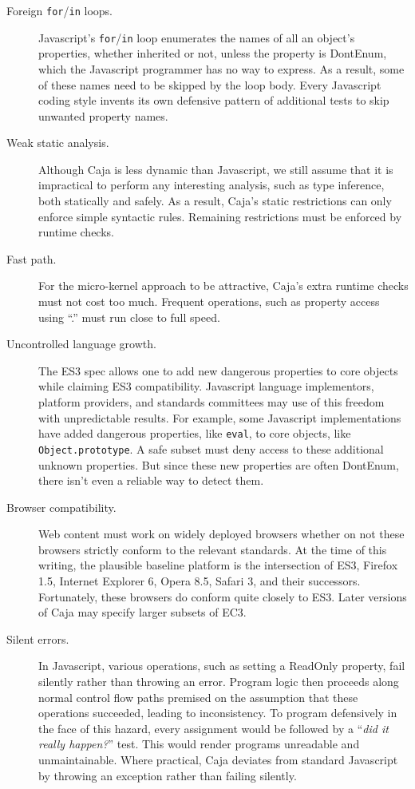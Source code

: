 \documentclass[letterpaper,twocolumn,10pt]{article}
\newcommand{\code}[1]{{\tt {#1}}}              %
\begin{document}
\begin{description}
  \item[Foreign \code{for}/\code{in} loops.] Javascript's 
  \code{for}/\code{in} loop enumerates the names of all an object's 
  properties, whether inherited or not, unless the property is DontEnum, 
  which the Javascript programmer has no way to express. As a result, some of 
  these names need to be skipped by the loop body. Every Javascript coding 
  style invents its own defensive pattern of additional tests to skip 
  unwanted property names.
    
  \item[Weak static analysis.] Although Caja is less dynamic than Javascript, 
  we still assume that it is impractical to perform any interesting analysis, 
  such as type inference, both statically and safely. As a result, Caja's 
  static restrictions can only enforce simple syntactic rules. Remaining 
  restrictions must be enforced by runtime checks.
  
  \item[Fast path.] For the micro-kernel approach to be attractive, Caja's 
  extra runtime checks must not cost too much. Frequent operations, such as 
  property access using ``.'' must run close to full speed.
  
  \item[Uncontrolled language growth.] The ES3 spec allows one to add new 
  dangerous properties to core objects while claiming ES3 compatibility. 
  Javascript language implementors, platform providers, and standards 
  committees may use of this freedom with unpredictable results. For example, 
  some Javascript implementations have added dangerous properties, like 
  \code{eval}, to core objects, like \code{Object.prototype}. A safe subset 
  must deny access to these additional unknown properties. But since these 
  new properties are often DontEnum, there isn't even a reliable way to 
  detect them.
  
  \item[Browser compatibility.] Web content must work on widely deployed 
  browsers whether on not these browsers strictly conform to the relevant 
  standards. At the time of this writing, the plausible baseline platform is 
  the intersection of ES3, Firefox 1.5, Internet Explorer 6, Opera 8.5, 
  Safari 3, and their successors. Fortunately, these browsers do conform 
  quite closely to ES3. Later versions of Caja may specify larger subsets of 
  EC3.
  
  \item[Silent errors.] In Javascript, various operations, such as setting a 
  ReadOnly property, fail silently rather than throwing an error. Program 
  logic then proceeds along normal control flow paths premised on the 
  assumption that these operations succeeded, leading to inconsistency. To 
  program defensively in the face of this hazard, every assignment would be 
  followed by a ``\emph{did it really happen?}'' test. This would render 
  programs unreadable and unmaintainable. Where practical, Caja deviates from 
  standard Javascript by throwing an exception rather than failing silently.
  

\end{description}
\end{document}
